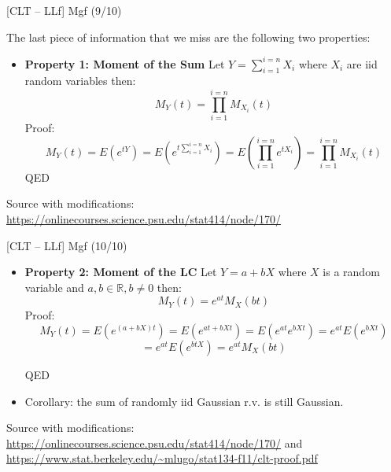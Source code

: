 \documentclass{beamer}
\begin{document}
\begin{frame}
{\centerline{[CLT -- LLf] Mgf (9/10)}}\label{S:MomentOfSum}
The last piece of information that we miss are the following two properties:
\begin{itemize}
\item  \textbf{Property 1: Moment of the Sum} Let $Y = \sum_{i=1}^{i=n} X_i$ where  $X_i$ are iid random variables then:
$$M_Y(t) = \prod_{i=1}^{i=n} M_{X_i}(t)$$
Proof:
$$M_Y(t) = E(e^{tY}) = E(e^{t\sum_{i=1}^{i=n} X_i}) = E(\prod_{i=1}^{i=n}e^{tX_i})=\prod_{i=1}^{i=n} M_{X_i}(t)$$
QED
\end{itemize}

\begin{center}
\tiny
Source with modifications: \url{https://onlinecourses.science.psu.edu/stat414/node/170/}
\end{center}
\end{frame}


\begin{frame}
{\centerline{[CLT -- LLf] Mgf (10/10)}}\label{S:MomentOfLC}
\begin{itemize}
\item \textbf{Property 2: Moment of the LC} Let $Y = a + bX$ where  $X$ is a random variable and $a, b \in \mathbb{R}, b \neq 0$ then:
$$M_Y(t) =  e^{at}M_{X}(bt)$$
Proof:
$$M_Y(t) =  E(e^{(a + bX)t}) = E(e^{at + bXt})= E(e^{at}e^{bXt}) = e^{at}E(e^{bXt})$$
$$= e^{at}E(e^{btX}) = e^{at}M_{X}(bt) $$

QED
\item Corollary: the sum of randomly iid Gaussian r.v. is still Gaussian.
\end{itemize}

\begin{center}
\tiny 
Source with modifications: \url{https://onlinecourses.science.psu.edu/stat414/node/170/} and \url{https://www.stat.berkeley.edu/~mlugo/stat134-f11/clt-proof.pdf}
\end{center}
\end{frame}
\end{document}
